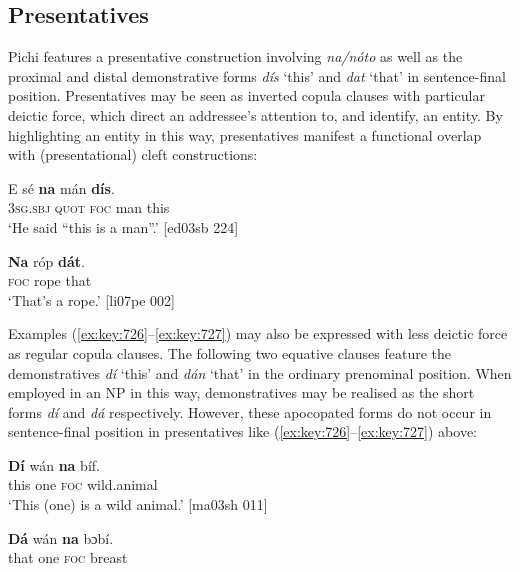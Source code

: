 \subsection{Presentatives}\label{sec:7.4.4}

Pichi features a presentative construction involving \textit{na}\textit{\textup{/}}\textit{nóto} as well as the proximal and distal demonstrative forms \textit{dís} ‘this’  and \textit{dat} ‘that’  in sentence-final position. Presentatives may be seen as inverted copula clauses with particular deictic force, which direct an addressee’s attention to, and identify, an entity. By highlighting an entity in this way, presentatives manifest a functional overlap with (presentational) cleft constructions: 


\ea%
    \label{ex:key:726}
    \gll E    sé    \textbf{na} mán    \textbf{dís}.\\
\textsc{3sg.sbj}  \textsc{quot}    \textsc{foc}  man    this\\

\glt ‘He said “this is a man”.’ [ed03sb 224]
\z


\ea%
    \label{ex:key:727}
    \gll \textbf{Na} róp    \textbf{dát}.\\
\textsc{foc}  rope  that\\

\glt ‘That’s a rope.’ [li07pe 002]
\z

Examples (\ref{ex:key:726}–\ref{ex:key:727}) may also be expressed with less deictic force as regular copula clauses. The following two equative clauses feature the demonstratives \textit{dí} ‘this’ and \textit{dán} ‘that’ in the ordinary prenominal position. When employed in an NP in this way, demonstratives may be realised as the short forms \textit{dí} and \textit{dá} respectively. However, these apocopated forms do not occur in sentence-final position in presentatives like (\ref{ex:key:726}–\ref{ex:key:727}) above: 


\ea%
    \label{ex:key:728}
    \gll \textbf{Dí}  wán    \textbf{na} bíf.\\
this  one    \textsc{foc}  wild.animal\\

\glt ‘This (one) is a wild animal.’ [ma03sh 011]
\z


\ea%
    \label{ex:key:729}
    \gll \textbf{Dá}  wán    \textbf{na} bɔbí.\\
that  one    \textsc{foc}  breast\\

